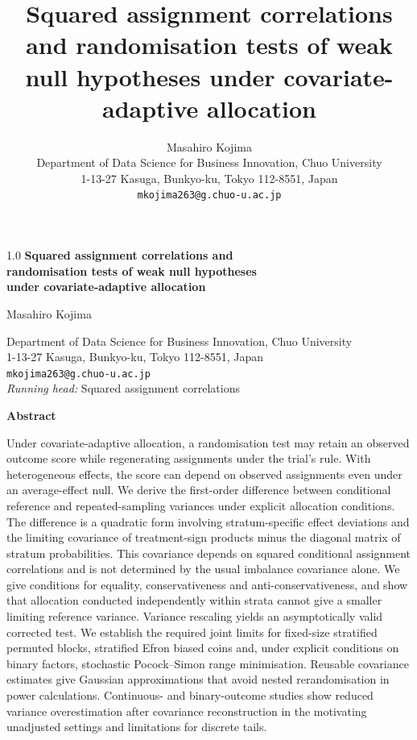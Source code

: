 \documentclass[12pt,a4paper]{article}
\title{Squared assignment correlations and randomisation tests of weak null hypotheses under covariate-adaptive allocation}
\author{Masahiro Kojima\\[2mm]
\normalsize Department of Data Science for Business Innovation, Chuo University\\
\normalsize 1-13-27 Kasuga, Bunkyo-ku, Tokyo 112-8551, Japan\\
\normalsize \texttt{mkojima263@g.chuo-u.ac.jp}}
\date{}
\theoremstyle{definition}
\renewenvironment{abstract}{\par\noindent\textbf{Abstract}\par}{\par}
\begin{document}
\begin{center}
\begin{spacing}{1.0}
{\Large\bfseries Squared assignment correlations and\\[2mm]
randomisation tests of weak null hypotheses\\[2mm]
under covariate-adaptive allocation}\par\vspace{5mm}
{\large Masahiro Kojima}\par\vspace{3mm}
Department of Data Science for Business Innovation, Chuo University\\
1-13-27 Kasuga, Bunkyo-ku, Tokyo 112-8551, Japan\\
\texttt{mkojima263@g.chuo-u.ac.jp}\\[2mm]
\textit{Running head:} Squared assignment correlations
\end{spacing}
\end{center}

\begin{abstract}
Under covariate-adaptive allocation, a randomisation test may retain an observed outcome score while regenerating assignments under the trial's rule. With heterogeneous effects, the score can depend on observed assignments even under an average-effect null. We derive the first-order difference between conditional reference and repeated-sampling variances under explicit allocation conditions. The difference is a quadratic form involving stratum-specific effect deviations and the limiting covariance of treatment-sign products minus the diagonal matrix of stratum probabilities. This covariance depends on squared conditional assignment correlations and is not determined by the usual imbalance covariance alone. We give conditions for equality, conservativeness and anti-conservativeness, and show that allocation conducted independently within strata cannot give a smaller limiting reference variance. Variance rescaling yields an asymptotically valid corrected test. We establish the required joint limits for fixed-size stratified permuted blocks, stratified Efron biased coins and, under explicit conditions on binary factors, stochastic Pocock--Simon range minimisation. Reusable covariance estimates give Gaussian approximations that avoid nested rerandomisation in power calculations. Continuous- and binary-outcome studies show reduced variance overestimation after covariance reconstruction in the motivating unadjusted settings and limitations for discrete tails.
\end{abstract}
\end{document}
